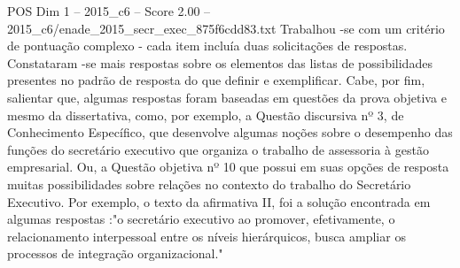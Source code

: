 \begin{textsample}{POS Dim 1 – 2015\_c6 – Score 2.00 – 2015\_c6/enade\_2015\_secr\_exec\_875f6cdd83.txt}
Trabalhou -se com um critério de pontuação complexo - cada item incluía duas solicitações de respostas.
Constataram -se mais respostas sobre os elementos das listas de possibilidades presentes no padrão de resposta do que definir e exemplificar.
Cabe, por fim, salientar que, algumas respostas foram baseadas em questões da prova objetiva e mesmo da dissertativa, como, por exemplo, a Questão discursiva nº 3, de Conhecimento Específico, que desenvolve algumas noções sobre o desempenho das funções do secretário executivo que organiza o trabalho de assessoria à gestão empresarial.
Ou, a Questão objetiva nº 10 que possui em suas opções de resposta muitas possibilidades sobre relações no contexto do trabalho do Secretário Executivo.
Por exemplo, o texto da afirmativa II, foi a solução encontrada em algumas respostas :"o secretário executivo ao promover, efetivamente, o relacionamento interpessoal entre os níveis hierárquicos, busca ampliar os processos de integração organizacional."

\end{textsample}
